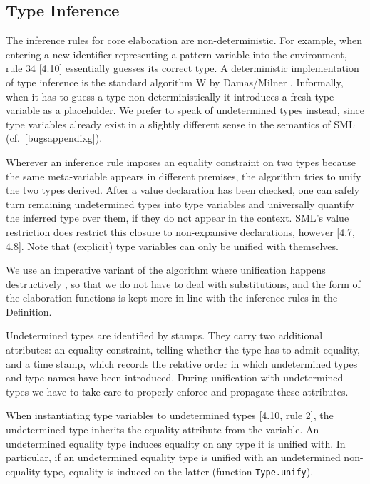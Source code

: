 \documentclass[twoside,titlepage]{article}
\begin{document}
\subsection{Type Inference}
\label{typeinference}

The inference rules for core elaboration are non-deterministic. For example, when entering a new identifier representing a pattern variable into the environment, rule 34 [4.10] essentially guesses its correct type. A deterministic implementation of type inference is the standard algorithm W by Damas/Milner \cite{principal}. Informally, when it has to guess a type non-deterministically it introduces a fresh type variable as a placeholder. We prefer to speak of undetermined types instead, since type variables already exist in a slightly different sense in the semantics of SML (cf.\ \ref{bugsappendixg}).

Wherever an inference rule imposes an equality constraint on two types because the same meta-variable appears in different premises, the algorithm tries to unify the two types derived.  After a value declaration has been checked, one can safely turn remaining undetermined types into type variables and universally quantify the inferred type over them, if they do not appear in the context. SML's value restriction does restrict this closure to non-expansive declarations, however [4.7, 4.8]. Note that (explicit) type variables can only be unified with themselves.

We use an imperative variant of the algorithm where unification happens destructively \cite{typechecking}, so that we do not have to deal with substitutions, and the form of the elaboration functions is kept more in line with the inference rules in the Definition.

Undetermined types are identified by stamps. They carry two additional attributes: an equality constraint, telling whether the type has to admit equality, and a time stamp, which records the relative order in which undetermined types and type names have been introduced. During unification with undetermined types we have to take care to properly enforce and propagate these attributes.

When instantiating type variables to undetermined types [4.10, rule 2], the undetermined type inherits the equality attribute from the variable. An undetermined equality type induces equality on any type it is unified with. In particular, if an undetermined equality type is unified with an undetermined non-equality type, equality is induced on the latter (function {\tt Type.unify}).
\end{document}
